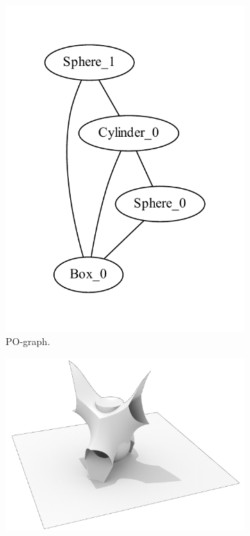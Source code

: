 \begin{figure}
\begin{subfigure}[b]{0.25\linewidth}
		\includegraphics[width=\textwidth]{figures/graph_m1.pdf}
		\caption{\ac{PO}-graph.}
	\end{subfigure}	
	\begin{subfigure}[b]{0.40\linewidth}
		\centering
		\includegraphics[width=\textwidth]{figures/m1_rendering_wo.png}

\end{subfigure}
\end{figure}
